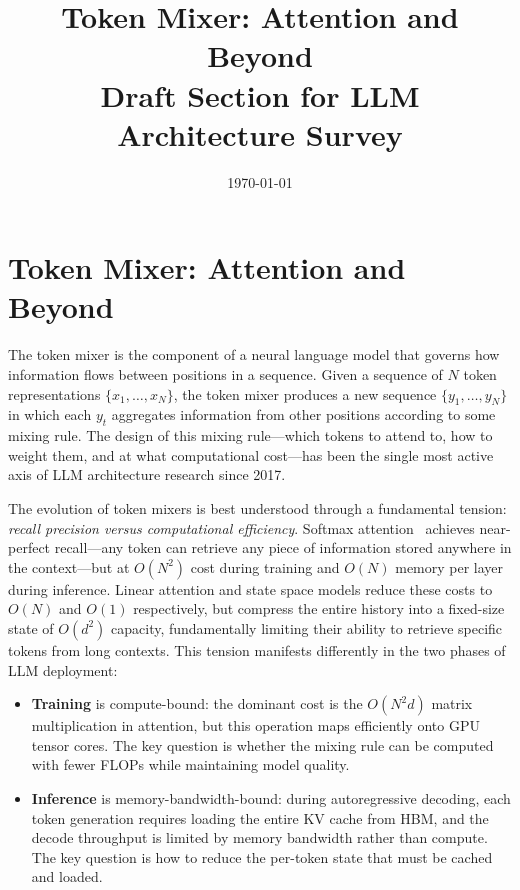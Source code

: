 \documentclass[11pt,a4paper]{article}
\title{\Large Token Mixer: Attention and Beyond\\[6pt]
\large Draft Section for LLM Architecture Survey}
\author{}
\date{\today}
\begin{document}
\maketitle
\tableofcontents
\newpage

\section{Token Mixer: Attention and Beyond}


The token mixer is the component of a neural language model that governs how information flows between positions in a sequence.
Given a sequence of $N$ token representations $\{x_1, \ldots, x_N\}$, the token mixer produces a new sequence $\{y_1, \ldots, y_N\}$ in which each $y_t$ aggregates information from other positions according to some mixing rule.
The design of this mixing rule---which tokens to attend to, how to weight them, and at what computational cost---has been the single most active axis of LLM architecture research since 2017.

The evolution of token mixers is best understood through a fundamental tension: \emph{recall precision versus computational efficiency}.
Softmax attention~\cite{vaswani2017attention} achieves near-perfect recall---any token can retrieve any piece of information stored anywhere in the context---but at $O(N^2)$ cost during training and $O(N)$ memory per layer during inference.
Linear attention and state space models reduce these costs to $O(N)$ and $O(1)$ respectively, but compress the entire history into a fixed-size state of $O(d^2)$ capacity, fundamentally limiting their ability to retrieve specific tokens from long contexts.
This tension manifests differently in the two phases of LLM deployment:

\begin{itemize}[nosep,leftmargin=*]
\item \textbf{Training} is compute-bound: the dominant cost is the $O(N^2 d)$ matrix multiplication in attention, but this operation maps efficiently onto GPU tensor cores. The key question is whether the mixing rule can be computed with fewer FLOPs while maintaining model quality.
\item \textbf{Inference} is memory-bandwidth-bound: during autoregressive decoding, each token generation requires loading the entire KV cache from HBM, and the decode throughput is limited by memory bandwidth rather than compute. The key question is how to reduce the per-token state that must be cached and loaded.
\end{itemize}
\end{document}
